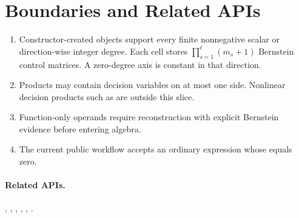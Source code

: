\section{Boundaries and Related APIs}
\label{sec:pdvar-limits}

\begin{enumerate}[leftmargin=*]
  \item Constructor-created  objects support every finite nonnegative scalar or direction-wise integer degree. Each cell stores $\prod_{s=1}^{\ell}(m_s+1)$ Bernstein control matrices. A zero-degree axis is constant in that direction. \item Products may contain decision variables on at most one side. Nonlinear decision products such as  are outside this slice. \item Function-only  operands require reconstruction with explicit Bernstein evidence before entering  algebra. \item The current public  workflow accepts an ordinary expression whose  equals zero.
\end{enumerate}

\paragraph{Related APIs.}
, , , , , .
